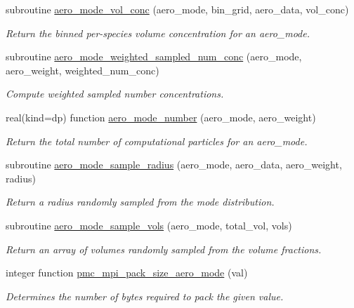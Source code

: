 \begin{DoxyCompactItemize}
subroutine \mbox{\hyperlink{namespacepmc__aero__mode_a2f932ab06c4f3ebb225150803cb41e67}{aero\+\_\+mode\+\_\+vol\+\_\+conc}} (aero\+\_\+mode, bin\+\_\+grid, aero\+\_\+data, vol\+\_\+conc)
\begin{DoxyCompactList}\small\item\em Return the binned per-\/species volume concentration for an aero\+\_\+mode. \end{DoxyCompactList}\item 
subroutine \mbox{\hyperlink{namespacepmc__aero__mode_a3ed922890993f9d3f7b0bdbd0a60e802}{aero\+\_\+mode\+\_\+weighted\+\_\+sampled\+\_\+num\+\_\+conc}} (aero\+\_\+mode, aero\+\_\+weight, weighted\+\_\+num\+\_\+conc)
\begin{DoxyCompactList}\small\item\em Compute weighted sampled number concentrations. \end{DoxyCompactList}\item 
real(kind=dp) function \mbox{\hyperlink{namespacepmc__aero__mode_aa2bc2252ff28ddb14f953f554a9afd62}{aero\+\_\+mode\+\_\+number}} (aero\+\_\+mode, aero\+\_\+weight)
\begin{DoxyCompactList}\small\item\em Return the total number of computational particles for an {\ttfamily aero\+\_\+mode}. \end{DoxyCompactList}\item 
subroutine \mbox{\hyperlink{namespacepmc__aero__mode_aff49b68e86fb9ba501fb2d33ba8a7a46}{aero\+\_\+mode\+\_\+sample\+\_\+radius}} (aero\+\_\+mode, aero\+\_\+data, aero\+\_\+weight, radius)
\begin{DoxyCompactList}\small\item\em Return a radius randomly sampled from the mode distribution. \end{DoxyCompactList}\item 
subroutine \mbox{\hyperlink{namespacepmc__aero__mode_aa79b2639f969c59afff4508ef90fdf67}{aero\+\_\+mode\+\_\+sample\+\_\+vols}} (aero\+\_\+mode, total\+\_\+vol, vols)
\begin{DoxyCompactList}\small\item\em Return an array of volumes randomly sampled from the volume fractions. \end{DoxyCompactList}\item 
integer function \mbox{\hyperlink{namespacepmc__aero__mode_a1e69cce7379ea06939d1181b8486288a}{pmc\+\_\+mpi\+\_\+pack\+\_\+size\+\_\+aero\+\_\+mode}} (val)
\begin{DoxyCompactList}\small\item\em Determines the number of bytes required to pack the given value. \end{DoxyCompactList}\item 

\end{DoxyCompactItemize}
